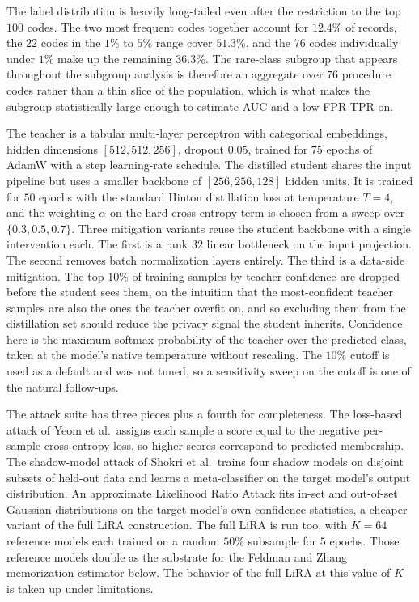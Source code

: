 \documentclass[conference]{IEEEtran}
\begin{document}
The label distribution is heavily long-tailed even after the restriction to the top $100$ codes. The two most frequent codes together account for $12.4\%$ of records, the $22$ codes in the $1\%$ to $5\%$ range cover $51.3\%$, and the $76$ codes individually under $1\%$ make up the remaining $36.3\%$. The rare-class subgroup that appears throughout the subgroup analysis is therefore an aggregate over $76$ procedure codes rather than a thin slice of the population, which is what makes the subgroup statistically large enough to estimate AUC and a low-FPR TPR on.

The teacher is a tabular multi-layer perceptron with categorical embeddings, hidden dimensions $[512, 512, 256]$, dropout $0.05$, trained for $75$ epochs of AdamW with a step learning-rate schedule. The distilled student shares the input pipeline but uses a smaller backbone of $[256, 256, 128]$ hidden units. It is trained for $50$ epochs with the standard Hinton distillation loss at temperature $T=4$, and the weighting $\alpha$ on the hard cross-entropy term is chosen from a sweep over $\{0.3, 0.5, 0.7\}$. Three mitigation variants reuse the student backbone with a single intervention each. The first is a rank $32$ linear bottleneck on the input projection. The second removes batch normalization layers entirely. The third is a data-side mitigation. The top $10\%$ of training samples by teacher confidence are dropped before the student sees them, on the intuition that the most-confident teacher samples are also the ones the teacher overfit on, and so excluding them from the distillation set should reduce the privacy signal the student inherits. Confidence here is the maximum softmax probability of the teacher over the predicted class, taken at the model's native temperature without rescaling. The $10\%$ cutoff is used as a default and was not tuned, so a sensitivity sweep on the cutoff is one of the natural follow-ups.

The attack suite has three pieces plus a fourth for completeness. The loss-based attack of Yeom et al.\ assigns each sample a score equal to the negative per-sample cross-entropy loss, so higher scores correspond to predicted membership. The shadow-model attack of Shokri et al.\ trains four shadow models on disjoint subsets of held-out data and learns a meta-classifier on the target model's output distribution. An approximate Likelihood Ratio Attack fits in-set and out-of-set Gaussian distributions on the target model's own confidence statistics, a cheaper variant of the full LiRA construction. The full LiRA is run too, with $K = 64$ reference models each trained on a random $50\%$ subsample for $5$ epochs. Those reference models double as the substrate for the Feldman and Zhang memorization estimator below. The behavior of the full LiRA at this value of $K$ is taken up under limitations.
\end{document}
